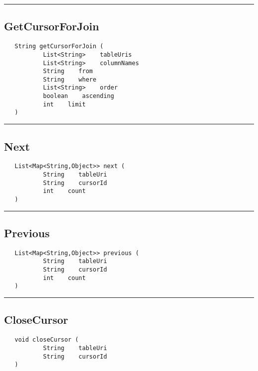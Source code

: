 \rule{15cm}{2pt}
\subsection{GetCursorForJoin}
\label{Api:GetCursorForJoin}
\begin{verbatim}
   String getCursorForJoin (
           List<String>    tableUris
           List<String>    columnNames
           String    from
           String    where
           List<String>    order
           boolean    ascending
           int    limit
   )
\end{verbatim}



\rule{15cm}{2pt}
\subsection{Next}
\label{Api:Next}
\begin{verbatim}
   List<Map<String,Object>> next (
           String    tableUri
           String    cursorId
           int    count
   )
\end{verbatim}



\rule{15cm}{2pt}
\subsection{Previous}
\label{Api:Previous}
\begin{verbatim}
   List<Map<String,Object>> previous (
           String    tableUri
           String    cursorId
           int    count
   )
\end{verbatim}



\rule{15cm}{2pt}
\subsection{CloseCursor}
\label{Api:CloseCursor}
\begin{verbatim}
   void closeCursor (
           String    tableUri
           String    cursorId
   )
\end{verbatim}



